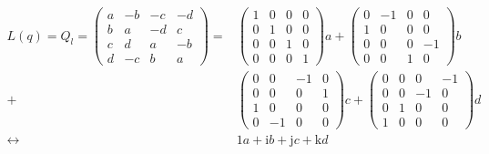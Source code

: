 \documentclass[
]{book}
\theoremstyle{definition}
\theoremstyle{definition}
\theoremstyle{definition}
\theoremstyle{definition}
\theoremstyle{remark}
\begin{document}
\[
\begin{aligned}
L\left(q\right)=Q_{{\scriptscriptstyle l}}=\begin{pmatrix}a & -b & -c & -d\\
b & a & -d & c\\
c & d & a & -b\\
d & -c & b & a
\end{pmatrix}= & \begin{pmatrix}1 & 0 & 0 & 0\\
0 & 1 & 0 & 0\\
0 & 0 & 1 & 0\\
0 & 0 & 0 & 1
\end{pmatrix}a+\begin{pmatrix}0 & -1 & 0 & 0\\
1 & 0 & 0 & 0\\
0 & 0 & 0 & -1\\
0 & 0 & 1 & 0
\end{pmatrix}b\\
+ & \begin{pmatrix}0 & 0 & -1 & 0\\
0 & 0 & 0 & 1\\
1 & 0 & 0 & 0\\
0 & -1 & 0 & 0
\end{pmatrix}c+\begin{pmatrix}0 & 0 & 0 & -1\\
0 & 0 & -1 & 0\\
0 & 1 & 0 & 0\\
1 & 0 & 0 & 0
\end{pmatrix}d\\
\leftrightarrow & 1a+\mathrm{i}b+\mathrm{j}c+\mathrm{k}d
\end{aligned}
\]
\end{document}

